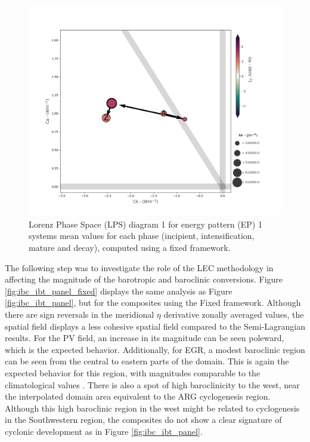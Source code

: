 \begin{figure}[!htbp]
\centering
\includegraphics[width=\textwidth]{figs_6/lps_fixed_means.png}
\caption[LPS for Fixed Framework Systems]{Lorenz Phase Space (LPS) diagram 1 for energy pattern (EP) 1 systems mean values for each phase (incipient, intensification, mature and decay), computed using a fixed framework.}
\label{fig:lps_fixed_means}
\end{figure}

The following step was to investigate the role of the LEC methodology in affecting the magnitude of the barotropic and baroclinic conversions. Figure \ref{fig:ibc_ibt_panel_fixed} displays the same analysis as Figure \ref{fig:ibc_ibt_panel}, but for the composites using the Fixed framework. Although there are sign reversals in the meridional $\eta$ derivative zonally averaged values, the spatial field displays a less cohesive spatial field compared to the Semi-Lagrangian results. For the PV field, an increase in its magnitude can be seen poleward, which is the expected behavior. Additionally, for EGR, a modest baroclinic region can be seen from the central to eastern parts of the domain. This is again the expected behavior for this region, with magnitudes comparable to the climatological values \citep{de2023storm}. There is also a spot of high baroclinicity to the west, near the interpolated domain area equivalent to the ARG cyclogenesis region. Although this high baroclinic region in the west might be related to cyclogenesis in the Southwestern region, the composites do not show a clear signature of cyclonic development as in Figure \ref{fig:ibc_ibt_panel}.

